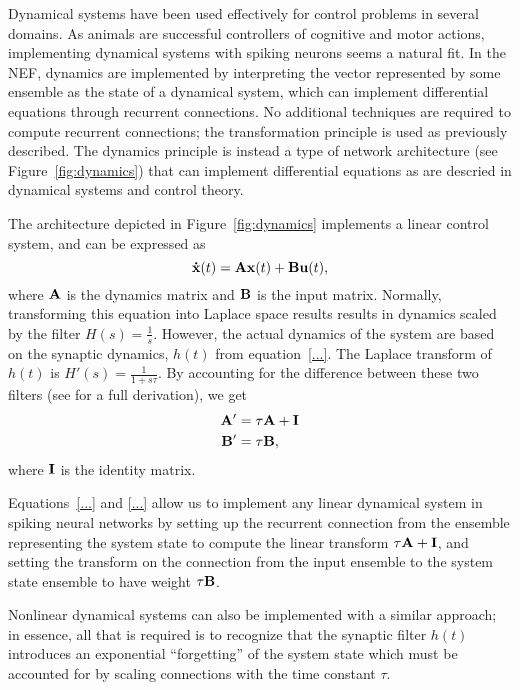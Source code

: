 {{Dynamical systems have been used effectively
for control problems in several domains.
As animals are successful controllers
of cognitive and motor actions,
implementing dynamical systems
with spiking neurons seems a natural fit.
In the NEF, dynamics are implemented
by interpreting the vector
represented by some ensemble as
the state of a dynamical system,
which can implement differential equations
through recurrent connections.
No additional techniques are required
to compute recurrent connections;
the transformation principle
is used as previously described.
The dynamics principle
is instead a type of network architecture
(see Figure~\ref{fig:dynamics}) that can
implement differential equations
as are descried in dynamical systems
and control theory.


The architecture depicted in Figure~\ref{fig:dynamics}
implements a linear control system,
and can be expressed as
\begin{equation}
  \mathbf{\dot{x}}(t) = \mathbf{Ax}(t) + \mathbf{Bu}(t),
\end{equation}
where $\mathbf{A}$ is the dynamics matrix
and $\mathbf{B}$ is the input matrix.
Normally, transforming this equation
into Laplace space results
results in dynamics scaled by
the filter $H(s) = \frac{1}{s}$.
However, the actual dynamics of the system
are based on the synaptic dynamics,
$h(t)$ from equation~\eqref{...}.
The Laplace transform of $h(t)$ is
$H'(s) = \frac{1}{1 + s\tau}$.
By accounting for the difference
between these two filters
(see \cite{eliasmith2004,eliasmith2013}
for a full derivation),
we get
\begin{align}
  \mathbf{A'} &= \tau \mathbf{A} + \mathbf{I} \\
  \mathbf{B'} &= \tau \mathbf{B},
\end{align}
where $\mathbf{I}$ is the identity matrix.

Equations~\eqref{...} and \eqref{...}
allow us to implement any linear dynamical system
in spiking neural networks
by setting up the recurrent connection
from the ensemble representing the system state
to compute the linear transform $\tau \mathbf{A} + \mathbf{I}$,
and setting the transform on the connection
from the input ensemble
to the system state ensemble
to have weight $\tau \mathbf{B}$.

Nonlinear dynamical systems can also be implemented
with a similar approach;
in essence, all that is required is to
recognize that the synaptic filter $h(t)$
introduces an exponential ``forgetting''
of the system state
which must be accounted for by scaling
connections with the time constant $\tau$.

}}
